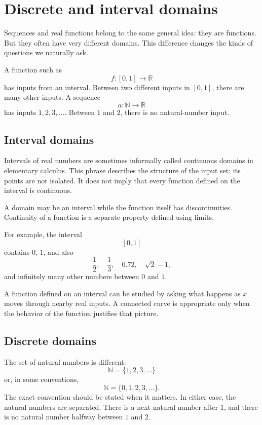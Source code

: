 \section{Discrete and interval domains}

Sequences and real functions belong to the same general idea: they are functions. But they often have very different domains. This difference changes the kinds of questions we naturally ask.

A function such as
\[
f:[0,1]\to\mathbb{R}
\]
has inputs from an interval. Between two different inputs in \([0,1]\), there are many other inputs. A sequence
\[
a:\mathbb{N}\to\mathbb{R}
\]
has inputs \(1,2,3,\ldots\). Between \(1\) and \(2\), there is no natural-number input.

\subsection*{Interval domains}

Intervals of real numbers are sometimes informally called continuous domains in elementary calculus. This phrase describes the structure of the input set: its points are not isolated. It does not imply that every function defined on the interval is continuous.

\begin{remarkbox}
A domain may be an interval while the function itself has discontinuities. Continuity of a function is a separate property defined using limits.
\end{remarkbox}

For example, the interval
\[
[0,1]
\]
contains \(0\), \(1\), and also
\[
\frac12,
\quad
\frac13,
\quad
0.72,
\quad
\sqrt{2}-1,
\]
and infinitely many other numbers between \(0\) and \(1\).

A function defined on an interval can be studied by asking what happens as \(x\) moves through nearby real inputs. A connected curve is appropriate only when the behavior of the function justifies that picture.

\subsection*{Discrete domains}

The set of natural numbers is different:
\[
\mathbb{N}=\{1,2,3,\ldots\}
\]
or, in some conventions,
\[
\mathbb{N}=\{0,1,2,3,\ldots\}.
\]
The exact convention should be stated when it matters. In either case, the natural numbers are separated. There is a next natural number after \(1\), and there is no natural number halfway between \(1\) and \(2\).

